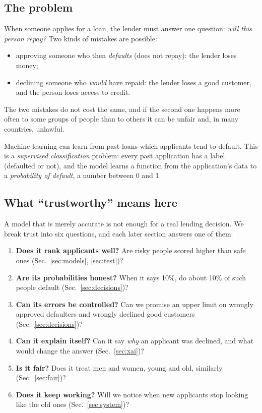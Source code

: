 \documentclass[conference,10pt]{IEEEtran}
\begin{document}
\subsection{The problem}
When someone applies for a loan, the lender must answer one question: \emph{will this person
repay?} Two kinds of mistakes are possible:
\begin{itemize}
\item approving someone who then \emph{defaults} (does not repay): the lender loses money;
\item declining someone who \emph{would} have repaid: the lender loses a good customer, and the
person loses access to credit.
\end{itemize}
The two mistakes do not cost the same, and if the second one happens more often to some groups
of people than to others it can be unfair and, in many countries, unlawful.

Machine learning can learn from past loans which applicants tend to default. This is a
\emph{supervised classification} problem: every past application has a label (defaulted or
not), and the model learns a function from the application's data to a \emph{probability of
default}, a number between 0 and 1.

\subsection{What ``trustworthy'' means here}
A model that is merely accurate is not enough for a real lending decision. We break trust into
six questions, and each later section answers one of them:
\begin{enumerate}
\item \textbf{Does it rank applicants well?} Are risky people scored higher than safe ones
(Sec.~\ref{sec:models}, \ref{sec:test})?
\item \textbf{Are its probabilities honest?} When it says 10\%, do about 10\% of such people
default (Sec.~\ref{sec:decisions})?
\item \textbf{Can its errors be controlled?} Can we promise an upper limit on wrongly approved
defaulters and wrongly declined good customers (Sec.~\ref{sec:decisions})?
\item \textbf{Can it explain itself?} Can it say \emph{why} an applicant was declined, and what
would change the answer (Sec.~\ref{sec:xai})?
\item \textbf{Is it fair?} Does it treat men and women, young and old, similarly
(Sec.~\ref{sec:fair})?
\item \textbf{Does it keep working?} Will we notice when new applicants stop looking like the
old ones (Sec.~\ref{sec:system})?
\end{enumerate}
\end{document}
